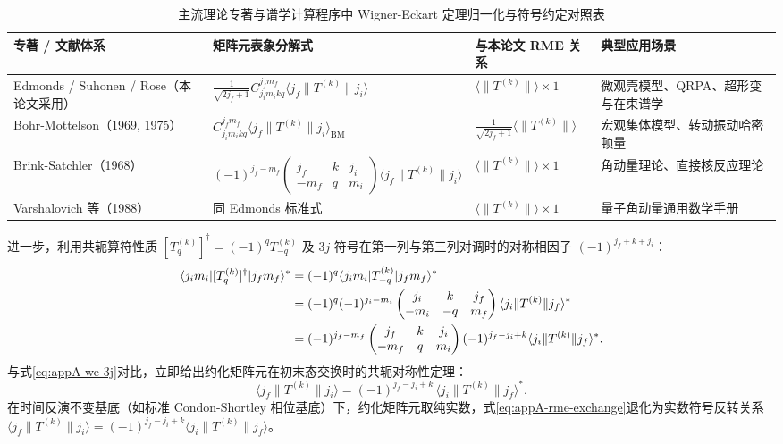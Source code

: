 \begin{table}[htbp]
\centering
\small
\caption{主流理论专著与谱学计算程序中 Wigner-Eckart 定理归一化与符号约定对照表}\label{tab:appA-convention-comparison}
\begin{tabularx}{\textwidth}{p{3.2cm} p{4.2cm} p{3.2cm} >{\raggedright\arraybackslash}X}
\toprule
专著 / 文献体系 & 矩阵元表象分解式 & 与本论文 RME 关系 & 典型应用场景 \\
\midrule
Edmonds / Suhonen / Rose（本论文采用） & $\frac{1}{\sqrt{2j_f+1}} C_{j_i m_i k q}^{j_f m_f} \langle j_f \| T^{(k)} \| j_i \rangle$ & $\langle \| T^{(k)} \| \rangle \times 1$ & 微观壳模型、QRPA、超形变与在束谱学 \\
\addlinespace
Bohr-Mottelson（1969, 1975） & $C_{j_i m_i k q}^{j_f m_f} \langle j_f \| T^{(k)} \| j_i \rangle_{\mathrm{BM}}$ & $\frac{1}{\sqrt{2j_f+1}} \langle \| T^{(k)} \| \rangle$ & 宏观集体模型、转动振动哈密顿量 \\
\addlinespace
Brink-Satchler（1968） & $(-1)^{j_f-m_f} \begin{pmatrix} j_f & k & j_i \\ -m_f & q & m_i \end{pmatrix} \langle j_f \| T^{(k)} \| j_i \rangle$ & $\langle \| T^{(k)} \| \rangle \times 1$ & 角动量理论、直接核反应理论 \\
\addlinespace
Varshalovich 等（1988） & 同 Edmonds 标准式 & $\langle \| T^{(k)} \| \rangle \times 1$ & 量子角动量通用数学手册 \\
\bottomrule
\end{tabularx}
\end{table}

进一步，利用共轭算符性质 $[T_q^{(k)}]^\dagger = (-1)^q T_{-q}^{(k)}$ 及 $3j$ 符号在第一列与第三列对调时的对称相因子 $(-1)^{j_f + k + j_i}$：
\begin{align}\label{eq:appA-rme-adjoint-deriv}
\langle j_i m_i | [T_q^{(k)}]^\dagger | j_f m_f \rangle^* &= (-1)^q \langle j_i m_i | T_{-q}^{(k)} | j_f m_f \rangle^* \notag \\
&= (-1)^q (-1)^{j_i - m_i} \begin{pmatrix} j_i & k & j_f \\ -m_i & -q & m_f \end{pmatrix} \langle j_i \| T^{(k)} \| j_f \rangle^* \notag \\
&= (-1)^{j_f - m_f} \begin{pmatrix} j_f & k & j_i \\ -m_f & q & m_i \end{pmatrix} (-1)^{j_f - j_i + k} \langle j_i \| T^{(k)} \| j_f \rangle^* .
\end{align}
与式\eqref{eq:appA-we-3j}对比，立即给出约化矩阵元在初末态交换时的共轭对称性定理：
\begin{equation}\label{eq:appA-rme-exchange}
\langle j_f \| T^{(k)} \| j_i \rangle = (-1)^{j_f - j_i + k} \, \langle j_i \| T^{(k)} \| j_f \rangle^* .
\end{equation}
在时间反演不变基底（如标准 Condon-Shortley 相位基底）下，约化矩阵元取纯实数，式\eqref{eq:appA-rme-exchange}退化为实数符号反转关系 $\langle j_f \| T^{(k)} \| j_i \rangle = (-1)^{j_f - j_i + k} \langle j_i \| T^{(k)} \| j_f \rangle$。

